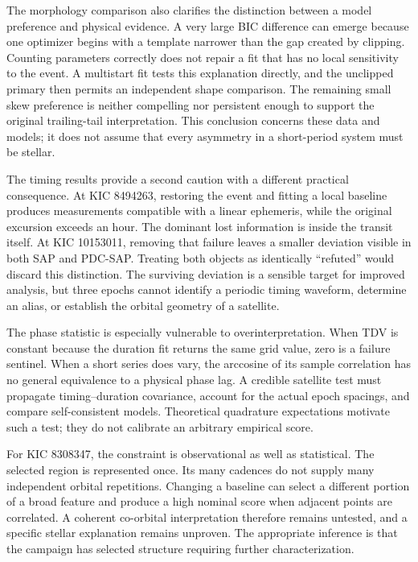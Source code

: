 \documentclass[
  english,
]{article}
\begin{document}
The morphology comparison also clarifies the distinction between a model
preference and physical evidence. A very large BIC difference can emerge
because one optimizer begins with a template narrower than the gap
created by clipping. Counting parameters correctly does not repair a fit
that has no local sensitivity to the event. A multistart fit tests this
explanation directly, and the unclipped primary then permits an
independent shape comparison. The remaining small skew preference is
neither compelling nor persistent enough to support the original
trailing-tail interpretation. This conclusion concerns these data and
models; it does not assume that every asymmetry in a short-period system
must be stellar.

The timing results provide a second caution with a different practical
consequence. At KIC 8494263, restoring the event and fitting a local
baseline produces measurements compatible with a linear ephemeris, while
the original excursion exceeds an hour. The dominant lost information is
inside the transit itself. At KIC 10153011, removing that failure leaves
a smaller deviation visible in both SAP and PDC-SAP. Treating both
objects as identically ``refuted'' would discard this distinction. The
surviving deviation is a sensible target for improved analysis, but
three epochs cannot identify a periodic timing waveform, determine an
alias, or establish the orbital geometry of a satellite.

The phase statistic is especially vulnerable to overinterpretation. When
TDV is constant because the duration fit returns the same grid value,
zero is a failure sentinel. When a short series does vary, the arccosine
of its sample correlation has no general equivalence to a physical phase
lag. A credible satellite test must propagate timing--duration
covariance, account for the actual epoch spacings, and compare
self-consistent models. Theoretical quadrature expectations motivate
such a test; they do not calibrate an arbitrary empirical score.

For KIC 8308347, the constraint is observational as well as statistical.
The selected region is represented once. Its many cadences do not supply
many independent orbital repetitions. Changing a baseline can select a
different portion of a broad feature and produce a high nominal score
when adjacent points are correlated. A coherent co-orbital
interpretation therefore remains untested, and a specific stellar
explanation remains unproven. The appropriate inference is that the
campaign has selected structure requiring further characterization.
\end{document}
